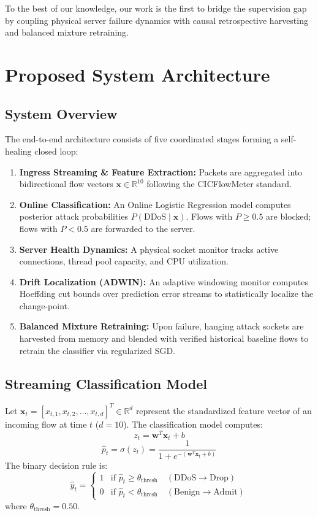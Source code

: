 \documentclass[conference]{IEEEtran}
\begin{document}
To the best of our knowledge, our work is the first to bridge the supervision gap by coupling physical server failure dynamics with causal retrospective harvesting and balanced mixture retraining.

\section{Proposed System Architecture}

\subsection{System Overview}
The end-to-end architecture consists of five coordinated stages forming a self-healing closed loop:
\begin{enumerate}
    \item \textbf{Ingress Streaming \& Feature Extraction:} Packets are aggregated into bidirectional flow vectors $\mathbf{x} \in \mathbb{R}^{10}$ following the CICFlowMeter standard.
    \item \textbf{Online Classification:} An Online Logistic Regression model computes posterior attack probabilities $P(\text{DDoS} \mid \mathbf{x})$. Flows with $P \ge 0.5$ are blocked; flows with $P < 0.5$ are forwarded to the server.
    \item \textbf{Server Health Dynamics:} A physical socket monitor tracks active connections, thread pool capacity, and CPU utilization.
    \item \textbf{Drift Localization (ADWIN):} An adaptive windowing monitor computes Hoeffding cut bounds over prediction error streams to statistically localize the change-point.
    \item \textbf{Balanced Mixture Retraining:} Upon failure, hanging attack sockets are harvested from memory and blended with verified historical baseline flows to retrain the classifier via regularized SGD.
\end{enumerate}

\subsection{Streaming Classification Model}
Let $\mathbf{x}_t = [x_{t,1}, x_{t,2}, \dots, x_{t,d}]^T \in \mathbb{R}^d$ represent the standardized feature vector of an incoming flow at time $t$ ($d=10$). The classification model computes:
\begin{equation}
z_t = \mathbf{w}^T \mathbf{x}_t + b
\end{equation}
\begin{equation}
\hat{p}_t = \sigma(z_t) = \frac{1}{1 + e^{-(\mathbf{w}^T \mathbf{x}_t + b)}}
\end{equation}
The binary decision rule is:
\begin{equation}
\hat{y}_t = \begin{cases} 
1 & \text{if } \hat{p}_t \ge \theta_{\text{thresh}} \quad (\text{DDoS} \rightarrow \text{Drop}) \\ 
0 & \text{if } \hat{p}_t < \theta_{\text{thresh}} \quad (\text{Benign} \rightarrow \text{Admit}) 
\end{cases}
\end{equation}
where $\theta_{\text{thresh}} = 0.50$.
\end{document}
